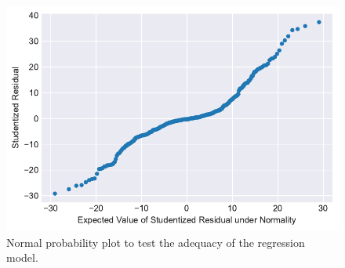 \begin{figure}[!tb]
  \centering
  \includegraphics[width=0.8\linewidth]{img/normal_probability_plot.pdf}
  \caption[Normal probability plot to test the adequacy of the regression model]
  {Normal probability plot to test the adequacy of the regression model.}
  \label{fig:normal_probability_plot}
\end{figure}
